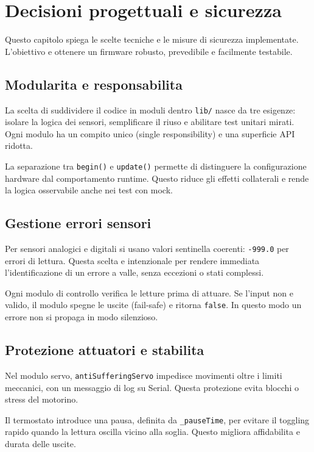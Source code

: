 \chapter{Decisioni progettuali e sicurezza}

Questo capitolo spiega le scelte tecniche e le misure di sicurezza implementate. L'obiettivo e ottenere un firmware robusto, prevedibile e facilmente testabile.

\section{Modularita e responsabilita}
La scelta di suddividere il codice in moduli dentro \texttt{lib/} nasce da tre esigenze: isolare la logica dei sensori, semplificare il riuso e abilitare test unitari mirati. Ogni modulo ha un compito unico (single responsibility) e una superficie API ridotta.

La separazione tra \texttt{begin()} e \texttt{update()} permette di distinguere la configurazione hardware dal comportamento runtime. Questo riduce gli effetti collaterali e rende la logica osservabile anche nei test con mock.

\section{Gestione errori sensori}
Per sensori analogici e digitali si usano valori sentinella coerenti: \texttt{-999.0} per errori di lettura. Questa scelta e intenzionale per rendere immediata l'identificazione di un errore a valle, senza eccezioni o stati complessi.

Ogni modulo di controllo verifica le letture prima di attuare. Se l'input non e valido, il modulo spegne le uscite (fail-safe) e ritorna \texttt{false}. In questo modo un errore non si propaga in modo silenzioso.

\section{Protezione attuatori e stabilita}
Nel modulo servo, \texttt{antiSufferingServo} impedisce movimenti oltre i limiti meccanici, con un messaggio di log su Serial. Questa protezione evita blocchi o stress del motorino.

Il termostato introduce una pausa, definita da \texttt{\_pauseTime}, per evitare il toggling rapido quando la lettura oscilla vicino alla soglia. Questo migliora affidabilita e durata delle uscite.

